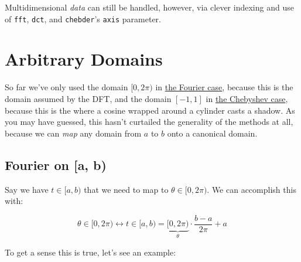 \documentclass[10pt]{article}
\begin{document}
Multidimensional \textit{data} can still be handled, however, via clever indexing and use of \texttt{fft}, \texttt{dct}, and \texttt{chebder}'s \texttt{axis} parameter.

\section{Arbitrary Domains}

So far we've only used the domain $[0, 2\pi)$ in \hyperref[dft]{the Fourier case}, because this is the domain assumed by the DFT, and the domain $[-1, 1]$ in \hyperref[cylinder]{the Chebyshev case}, because this is the where a cosine wrapped around a cylinder casts a shadow. As you may have guessed, this hasn't curtailed the generality of the methods at all, because we can \textit{map} any domain from $a$ to $b$ onto a canonical domain.

\subsection{Fourier on [a, b)}

Say we have $t \in [a, b)$ that we need to map to $\theta \in [0, 2\pi)$. We can accomplish this with:

$$\theta \in [0, 2\pi) \leftrightarrow t \in [a, b) = \underbrace{[0, 2\pi)}_{\theta} \cdot \frac{b - a}{2\pi} + a$$

To get a sense this is true, let's see an example:
\end{document}
